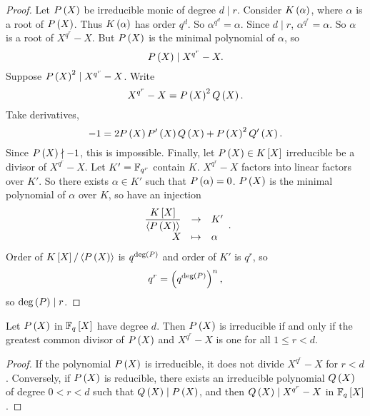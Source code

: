 \begin{proof}
Let $ P\left( X \right) $ be irreducible monic of degree $ d \mid r $. Consider $ K\left( \alpha \right) $, where $ \alpha $ is a root of $ P\left( X \right) $. Thus $ K\left( \alpha \right) $ has order $ q^d $. So $ \alpha^{q^d} = \alpha $. Since $ d \mid r $, $ \alpha^{q^r} = \alpha $. So $ \alpha $ is a root of $ X^{q^r} - X $. But $ P\left( X \right) $ is the minimal polynomial of $ \alpha $, so
$$ P\left( X \right) \mid X^{q^r} - X. $$
Suppose $ P\left( X \right)^2 \mid X^{q^r} - X $. Write
$$ X^{q^r} - X = P\left( X \right)^2Q\left( X \right). $$
Take derivatives,
$$ -1 = 2P\left( X \right)P'\left( X \right)Q\left( X \right) + P\left( X \right)^2Q'\left( X \right). $$
Since $ P\left( X \right) \nmid -1 $, this is impossible. Finally, let $ P\left( X \right) \in K\left[ X \right] $ irreducible be a divisor of $ X^{q^r} - X $. Let $ K' = \mathbb{F}_{q^r} $ contain $ K $. $ X^{q^r} - X $ factors into linear factors over $ K' $. So there exists $ \alpha \in K' $ such that $ P\left( \alpha \right) = 0 $. $ P\left( X \right) $ is the minimal polynomial of $ \alpha $ over $ K $, so have an injection
$$ \function{\dfrac{K\sb{X}}{\ab{P\rb{X}}}}{K'}{X}{\alpha}. $$
Order of $ K\left[ X \right] / \left\langle P\left( X \right) \right\rangle $ is $ q^{\deg\left( P \right)} $ and order of $ K' $ is $ q^r $, so
$$ q^r = \left( q^{\deg\left( P \right)} \right)^n, $$
so $ \deg\left( P \right) \mid r $.
\end{proof}

\begin{corollary}
Let $ P\left( X \right) $ in $ \mathbb{F}_q\left[ X \right] $ have degree $ d $. Then $ P\left( X \right) $ is irreducible if and only if the greatest common divisor of $ P\left( X \right) $ and $ X^{q^r} - X $ is one for all $ 1 \le r < d $.
\end{corollary}

\begin{proof}
If the polynomial $ P\left( X \right) $ is irreducible, it does not divide $ X^{q^r} - X $ for $ r < d $. Conversely, if $ P\left( X \right) $ is reducible, there exists an irreducible polynomial $ Q\left( X \right) $ of degree $ 0 < r < d $ such that $ Q\left( X \right) \mid P\left( X \right) $, and then $ Q\left( X \right) \mid X^{q^r} - X $ in $ \mathbb{F}_q\left[ X \right] $.
\end{proof}

